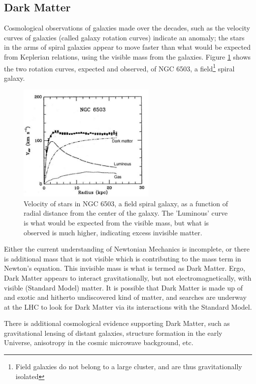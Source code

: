 \documentclass[11pt,a4paper,openright,twoside]{report}
\begin{document}
\subsection{Dark Matter}
Cosmological observations of galaxies made over the decades, such as the velocity curves of galaxies (called galaxy rotation curves) indicate an anomaly; the stars in the arms of spiral galaxies appear to move faster than what would be expected from Keplerian relations, using the visible mass from the galaxies. Figure \ref{fig:grc} shows the two rotation curves, expected and observed, of NGC 6503, a field\footnote{Field galaxies do not belong to a large cluster, and are thus gravitationally isolated}  spiral galaxy.\cite{galaxy}
\begin{figure}[H]
\centering
	\includegraphics[width=0.6\textwidth]{GRC.jpeg}
	\caption{Velocity of stars in NGC 6503, a field spiral galaxy, as a function of radial distance from the center of the galaxy\cite{galaxy}. The 'Luminous' curve is what would be expected from the visible mass, but what is observed is much higher, indicating excess invisible matter.}
	\label{fig:grc}
\end{figure}
Either the current understanding of Newtonian Mechanics is incomplete, or there is additional mass that is not visible which is contributing to the mass term in Newton's equation. This invisible mass is what is termed as Dark Matter. Ergo, Dark Matter appears to interact gravitationally, but not electromagnetically, with visible (Standard Model) matter. It is possible that Dark Matter is made up of and exotic and hitherto undiscovered kind of matter, and searches are underway at the LHC to look for Dark Matter via its interactions with the Standard Model.

There is additional cosmological evidence supporting Dark Matter, such as gravitational lensing of distant galaxies, structure formation in the early Universe, anisotropy in the cosmic microwave background, etc.
\end{document}
